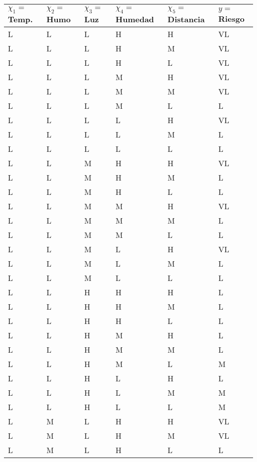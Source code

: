 \begin{center}
	\def\arraystretch{1.5}
    \begin{longtable}{| l | l | l | l | l | l |}
    \hline
    $\chi_1=$ Temp. &  $\chi_2=$ Humo &  $\chi_3=$ Luz &  $\chi_4=$ Humedad &  $\chi_5=$ Distancia &  $y=$ Riesgo \\ \hline
    L & L & L & H & H & VL \\ \hline 
    L & L & L & H & M & VL \\ \hline 
    L & L & L & H & L & VL \\ \hline 
    L & L & L & M & H & VL \\ \hline 
    L & L & L & M & M & VL \\ \hline 
    L & L & L & M & L & L \\ \hline 
    L & L & L & L & H & VL \\ \hline 
    L & L & L & L & M & L \\ \hline 
    L & L & L & L & L & L \\ \hline 
    L & L & M & H & H & VL \\ \hline 
    L & L & M & H & M & L \\ \hline 
    L & L & M & H & L & L \\ \hline 
    L & L & M & M & H & VL \\ \hline 
    L & L & M & M & M & L \\ \hline 
    L & L & M & M & L & L \\ \hline 
    L & L & M & L & H & VL \\ \hline 
    L & L & M & L & M & L \\ \hline 
    L & L & M & L & L & L \\ \hline 
    L & L & H & H & H & L \\ \hline 
    L & L & H & H & M & L \\ \hline 
    L & L & H & H & L & L \\ \hline 
    L & L & H & M & H & L \\ \hline 
    L & L & H & M & M & L \\ \hline 
    L & L & H & M & L & M \\ \hline 
    L & L & H & L & H & L \\ \hline 
    L & L & H & L & M & M \\ \hline 
    L & L & H & L & L & M \\ \hline 
    L & M & L & H & H & VL \\ \hline 
    L & M & L & H & M & VL \\ \hline 
    L & M & L & H & L & L \\ \hline 

\end{longtable}
\end{center}
